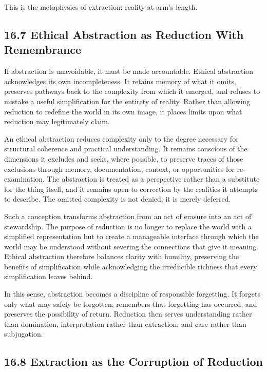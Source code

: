 \documentclass[12pt,letterpaper]{article}
\theoremstyle{remark}
\begin{document}
This is the metaphysics of extraction: reality at arm’s length.

\subsection{16.7 Ethical Abstraction as Reduction With Remembrance}

If abstraction is unavoidable, it must be made accountable. Ethical abstraction acknowledges its own incompleteness. It retains memory of what it omits, preserves pathways back to the complexity from which it emerged, and refuses to mistake a useful simplification for the entirety of reality. Rather than allowing reduction to redefine the world in its own image, it places limits upon what reduction may legitimately claim.

An ethical abstraction reduces complexity only to the degree necessary for structural coherence and practical understanding. It remains conscious of the dimensions it excludes and seeks, where possible, to preserve traces of those exclusions through memory, documentation, context, or opportunities for re-examination. The abstraction is treated as a perspective rather than a substitute for the thing itself, and it remains open to correction by the realities it attempts to describe. The omitted complexity is not denied; it is merely deferred.

Such a conception transforms abstraction from an act of erasure into an act of stewardship. The purpose of reduction is no longer to replace the world with a simplified representation but to create a manageable interface through which the world may be understood without severing the connections that give it meaning. Ethical abstraction therefore balances clarity with humility, preserving the benefits of simplification while acknowledging the irreducible richness that every simplification leaves behind.

In this sense, abstraction becomes a discipline of responsible forgetting. It forgets only what may safely be forgotten, remembers that forgetting has occurred, and preserves the possibility of return. Reduction then serves understanding rather than domination, interpretation rather than extraction, and care rather than subjugation.

\subsection{16.8 Extraction as the Corruption of Reduction}
\end{document}
